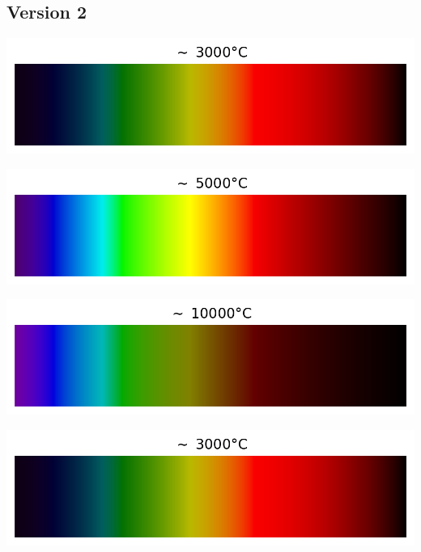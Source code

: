 \documentclass[12pt,a4paper,fleqn]{article}
\begin{document}
\begin{landscape}
\newpage
\section*{Version 2}

\begin{center}
\begin{multicols}{3}
\includegraphics[width=\linewidth]{images/spectrum_black_body_temp3000K.png}

\includegraphics[width=\linewidth]{images/spectrum_black_body_temp5000K.png}

\includegraphics[width=\linewidth]{images/spectrum_black_body_temp10000K.png}
\end{multicols}
\end{center}

\begin{center}
\begin{multicols}{3}
\includegraphics[width=\linewidth]{images/spectrum_black_body_temp3000K.png}


\end{multicols}
\end{center}
\end{landscape}
\end{document}
